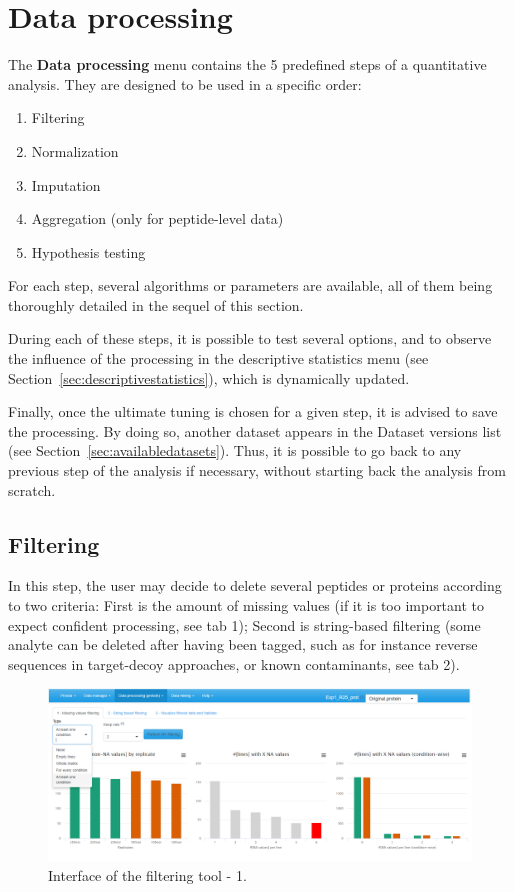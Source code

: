 \documentclass[12pt]{article}
\begin{document}
\section{Data processing}\label{sec:processingadataset}

The \textbf{Data processing} menu contains the 5 predefined steps of a quantitative 
analysis. They are designed to be used in a specific order:
\begin{enumerate}
\item {Filtering}
\item{Normalization}
\item{Imputation}
\item{Aggregation} (only for peptide-level data)
\item{Hypothesis testing}
\end{enumerate}
For each step, several algorithms or parameters are available, all of them being 
thoroughly detailed in the sequel of this section.

During each of these steps, it is possible to test several options, and to 
observe the influence of the processing in the descriptive statistics menu 
(see Section~\ref{sec:descriptivestatistics}), which is dynamically updated. 

Finally, once the ultimate tuning is chosen for a given step, it is advised 
to save the processing. By doing so, another dataset appears in the Dataset 
versions list (see Section~\ref{sec:availabledatasets}). Thus, it is possible 
to go back to any previous step of the analysis if necessary, without starting 
back the analysis from scratch.

\subsection{Filtering}\label{sec:filtering}
In this step, the user may decide to delete several peptides or proteins 
according to two criteria: First is the amount of missing values (if it is
too important to expect confident processing, see tab 1); 
Second is string-based filtering (some analyte can be deleted after having been
tagged, such as for instance reverse sequences in target-decoy approaches, or
known contaminants, see tab 2).

\begin {figure}
\includegraphics[width=\textwidth]{images/filter1.png}
\caption{Interface of the filtering tool - 1.}\label{fig:filter1}
\end {figure}
\end{document}

